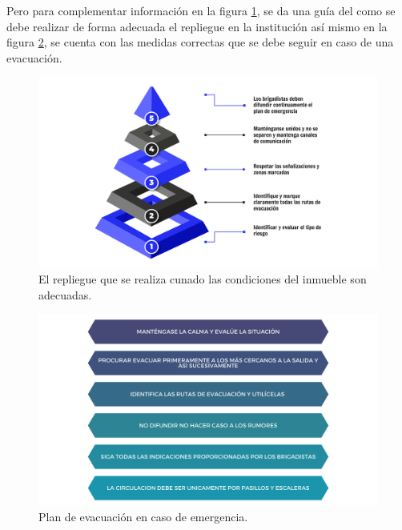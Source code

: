     Pero para complementar información en la figura \ref{fig:planDeRepliege}, se da una guía del como se debe realizar de forma adecuada el repliegue en la institución así mismo en la figura \ref{fig:planDeEvacuacion}, se cuenta con las medidas correctas que se debe seguir en caso de una evacuación.
    \begin{figure}[H]
        \centering
        \includegraphics[trim = {60mm 10mm 60mm 10mm},clip,scale=0.22]{22/Img/repliegue.pdf}
        \caption{El repliegue que se realiza cunado las condiciones del inmueble son adecuadas.}
        \label{fig:planDeRepliege}
    \end{figure}
    
    
    
    \begin{figure}[H]
        \centering
        \includegraphics[trim = {60mm 10mm 60mm 10mm},clip,scale=0.2]{22/Img/evacuacion.pdf}
        \caption{Plan de evacuación en caso de emergencia.}
        \label{fig:planDeEvacuacion}
    \end{figure}
    
    
    
